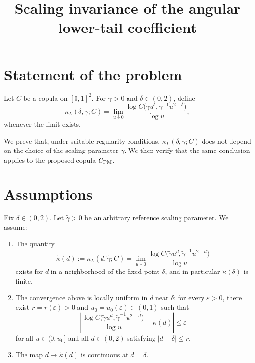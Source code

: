 \documentclass[11pt]{article}
\begin{document}
\title{Scaling invariance of the angular lower-tail coefficient}
\author{}
\date{}
\maketitle

\section*{Statement of the problem}

Let \(C\) be a copula on \([0,1]^2\). For \(\gamma>0\) and \(\delta\in(0,2)\), define
\[
\kappa_L(\delta,\gamma;C)
=
\lim_{u\downarrow 0}
\frac{\log C\!\bigl(\gamma u^\delta,\gamma^{-1}u^{2-\delta}\bigr)}{\log u},
\]
whenever the limit exists.

We prove that, under suitable regularity conditions, \(\kappa_L(\delta,\gamma;C)\) does not depend on the choice of the scaling parameter \(\gamma\). We then verify that the same conclusion applies to the proposed copula \(C_{\rm PM}\).

\section*{Assumptions}

Fix \(\delta\in(0,2)\). Let \(\tilde\gamma>0\) be an arbitrary reference scaling parameter. We assume:

\begin{enumerate}[label=\textnormal{(A\arabic*)}]
\item \label{A1}
The quantity
\[
\tilde{\kappa}(d):=\kappa_L(d,\tilde\gamma;C)
=
\lim_{u\downarrow 0}
\frac{\log C\!\bigl(\tilde\gamma u^d,\tilde\gamma^{-1}u^{2-d}\bigr)}{\log u}
\]
exists for \(d\) in a neighborhood of the fixed point \(\delta\), and in particular
\(\tilde{\kappa}(\delta)\) is finite.

\item \label{A2}
The convergence above is locally uniform in \(d\) near \(\delta\): for every \(\varepsilon>0\), there exist \(r=r(\varepsilon)>0\) and \(u_0=u_0(\varepsilon)\in(0,1)\) such that
\[
\left|
\frac{\log C\!\bigl(\tilde\gamma u^d,\tilde\gamma^{-1}u^{2-d}\bigr)}{\log u}
-
\tilde{\kappa}(d)
\right|
\le \varepsilon
\]
for all \(u\in(0,u_0]\) and all \(d\in(0,2)\) satisfying \(|d-\delta|\le r\).

\item \label{A3}
The map \(d\mapsto \tilde{\kappa}(d)\) is continuous at \(d=\delta\).
\end{enumerate}
\end{document}
